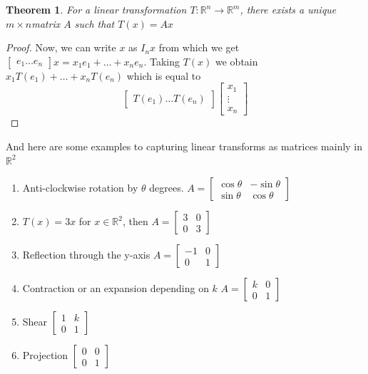 \documentclass[titlepage]{article}
\newtheorem{thm}{Theorem}[subsection]
\numberwithin{equation}{subsection}
\begin{document}
\begin{thm}
For a linear transformation $T:\mathbb{R}^n \to \mathbb{R}^m$, there exists a unique $m\times n$matrix $A$ such that $T(x) = Ax$
\end{thm}

\begin{proof}
Now, we can write $x$ as $I_{n}x$ from which we get $\begin{bmatrix}
    e_{1} \ldots e_{n}
\end{bmatrix}x = x_{1}e_{1} + \ldots + x_{n}e_{n}$. Taking $T(x)$ we obtain $x_{1}T(e_{1}) + \ldots + x_{n}T(e_{n})$ which is equal to $$\begin{bmatrix}
    T(e_{1}) \ldots T(e_{n})
\end{bmatrix} \begin{bmatrix}
    x_{1} \\
    \vdots \\
    x_{n} 
\end{bmatrix}$$
\end{proof}

And here are some examples to capturing linear transforms as matrices mainly in $\mathbb{R}^2$
\begin{example}
\begin{enumerate}
    \item Anti-clockwise rotation by $\theta$ degrees. $A = \begin{bmatrix}
        \cos{\theta} & -\sin{\theta}\\
        \sin{\theta} & \cos{\theta}
    \end{bmatrix}$ 
    \item $T(x) = 3x$ for $x \in \mathbb{R} ^ 2$, then $A = \begin{bmatrix}
        3 & 0 \\
        0 & 3
    \end{bmatrix}$
    \item Reflection through the y-axis $A = \begin{bmatrix}
        -1 & 0\\
        0 & 1
    \end{bmatrix}$
    \item Contraction or an expansion depending on $k$ $ A = \begin{bmatrix}
        k & 0\\
        0 & 1
    \end{bmatrix}$ 
    \item Shear $\begin{bmatrix}
        1 & k\\
        0 & 1
    \end{bmatrix}$
    \item Projection $\begin{bmatrix}
        0 & 0\\
        0 & 1
    \end{bmatrix}$
    
\end{enumerate}
\end{example}
\end{document}
